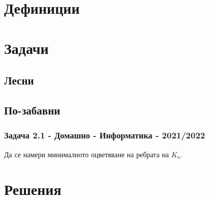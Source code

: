 \documentclass[12pt]{article}
\begin{document}
\section*{Дефиниции}

\section*{Задачи}

\subsection*{Лесни} 

\subsection*{По-забавни}
\subsubsection*{Задача 2.1 - Домашно - Информатика - 2021/2022}
Да се намери минималното оцветяване на ребрата на $K_n$.

\section*{Решения}
\end{document}
